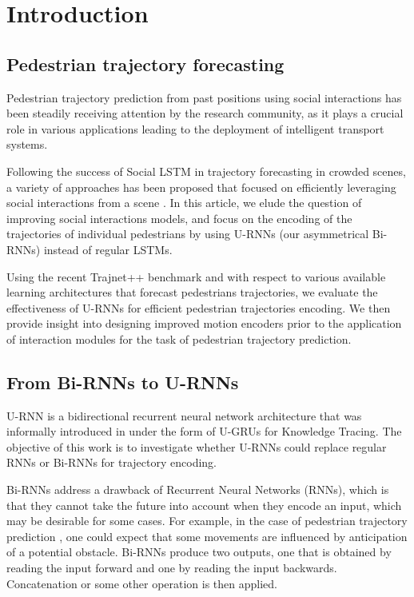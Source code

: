 \documentclass[conference]{IEEEtran}
\begin{document}
\section{Introduction}

\subsection{Pedestrian trajectory forecasting}

Pedestrian trajectory prediction from past positions using social interactions has been steadily receiving attention by the research community, as it plays a crucial role in various applications leading to the deployment of intelligent transport systems.

Following the success of Social LSTM \cite{alahi_social_2016} in trajectory forecasting in crowded scenes, a variety of approaches has been proposed that focused on efficiently leveraging social interactions from a scene \cite{gupta_social_2018,kothari_human_2021,bartoli2018context,pfeiffer2018data,vemula2018social,ma2016artificial}. In this article, we elude the question of improving social interactions models, and focus on the encoding of the trajectories of individual pedestrians by using U-RNNs (our asymmetrical Bi-RNNs) instead of regular LSTMs.

Using the recent Trajnet++ benchmark \cite{kothari_human_2021} and with respect to various available learning architectures that forecast pedestrians trajectories, we evaluate the effectiveness of U-RNNs for efficient pedestrian trajectories encoding. We then provide insight into designing improved motion encoders prior to the application of interaction modules for the task of pedestrian trajectory prediction.



\subsection{From Bi-RNNs to U-RNNs}


U-RNN is a bidirectional recurrent neural network architecture that was informally introduced in \cite{kaggle} under the form of U-GRUs for Knowledge Tracing. The objective of this work is to investigate whether U-RNNs could replace regular RNNs or Bi-RNNs for trajectory encoding.

Bi-RNNs \cite{650093} address a drawback of Recurrent Neural Networks (RNNs), which is that they cannot take the future into account when they encode an input, which may be desirable \cite{Goodfellow-et-al-2016} for some cases. 
For example, in the case of pedestrian trajectory prediction \cite{xue2017bi,yao2021bitrap}, one could expect that some movements are influenced by anticipation of a potential obstacle. Bi-RNNs produce two outputs, one that is obtained by reading the input forward and one by reading the input backwards. Concatenation or some other operation is then applied.
\end{document}
